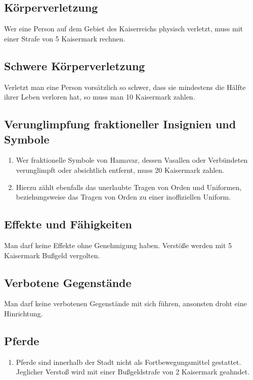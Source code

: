 \documentclass{article}
\begin{document}
\subsection{Körperverletzung}
Wer eine Person auf dem Gebiet des Kaiserreichs physisch verletzt, muss mit einer Strafe von 5 Kaisermark rechnen.

\subsection{Schwere Körperverletzung}
Verletzt man eine Person vorsätzlich so schwer, dass sie mindestens die Hälfte ihrer Leben verloren hat, so muss man 10 Kaisermark zahlen.

\subsection{Verunglimpfung fraktioneller Insignien und Symbole}
\begin{enumerate}[(1)]
    \item Wer fraktionelle Symbole von Hamavar, dessen Vasallen oder Verbündeten verunglimpft oder absichtlich entfernt, muss 20 Kaisermark zahlen.
    \item Hierzu zählt ebenfalls das unerlaubte Tragen von Orden und Uniformen, beziehungsweise das Tragen von Orden zu einer inoffiziellen Uniform.    
\end{enumerate}

\subsection{Effekte und Fähigkeiten}
Man darf keine Effekte ohne Genehmigung haben. Verstöße werden mit 5 Kaisermark Bußgeld vergolten.

\subsection{Verbotene Gegenstände}
Man darf keine verbotenen Gegenstände mit sich führen, ansonsten droht eine Hinrichtung.

\subsection{Pferde}
\begin{enumerate}[(1)]
    \item Pferde sind innerhalb der Stadt nicht als Fortbewegungsmittel gestattet. Jeglicher Verstoß wird mit einer Bußgeldstrafe von 2 Kaisermark geahndet. 
\end{enumerate}
\end{document}
